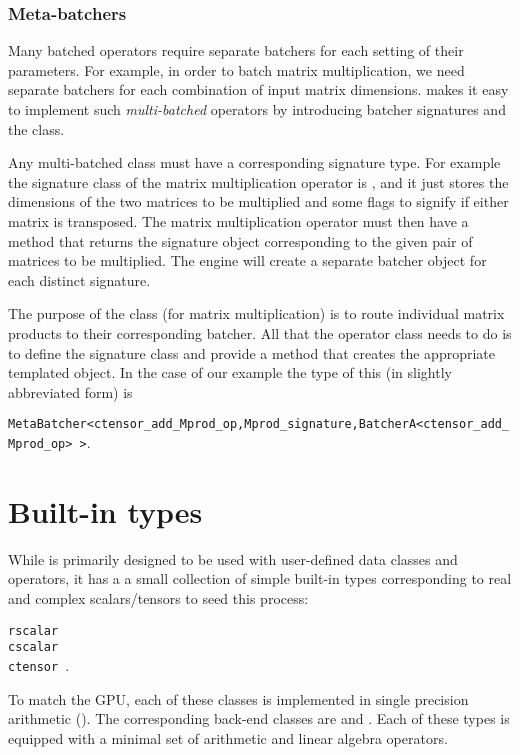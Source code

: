 \subsubsection*{Meta-batchers}

Many batched operators require separate batchers for each setting of their parameters. For example, 
in order to batch matrix multiplication, we need separate batchers for each combination of input matrix 
dimensions. \Cengine{} makes it easy to implement such \emph{multi-batched} operators by introducing batcher 
signatures and the  class. 

Any multi-batched class must have a corresponding signature type. For example the signature class of the 
matrix multiplication operator is , 
and it just stores the dimensions of the two matrices to be multiplied and 
some flags to signify if either matrix is transposed. The matrix multiplication operator 
 must then have a  method that returns the signature object 
corresponding to the given pair of matrices to be multiplied. 
The engine will create a separate batcher object for each distinct signature. 

The purpose of the  class (for matrix multiplication) is to 
route individual matrix products to their corresponding batcher.  
All that the operator class needs to do is to define the signature class and provide a 
 method that creates the appropriate templated  object. 
In the case of our example the type of this (in slightly abbreviated form) is 

\texttt{MetaBatcher<ctensor\_add\_Mprod\_op,Mprod\_signature,BatcherA<ctensor\_add\_Mprod\_op> >}.


\section*{Built-in types}

While \Cengine{} is primarily designed to be used with user-defined data classes and operators, it has a 
a small collection of simple built-in types corresponding to real and complex scalars/tensors to 
seed this process:

\texttt{\phantom{MM}rscalar\\\phantom{MM}cscalar\\\phantom{MM}ctensor
}.

To match the GPU, each of these classes is implemented in single precision arithmetic (). 
The corresponding back-end classes are  and . 
Each of these types is equipped with a minimal set of arithmetic and linear algebra operators. 


